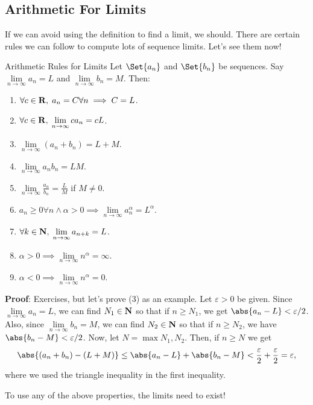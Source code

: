 \subsection{Arithmetic For Limits}
If we can avoid using the definition to find a limit, we should.
There are certain rules we can follow to compute lots of sequence limits.
Let's see them now!

\begin{Theorem}{Arithmetic Rules for Limits}{}
    Let $ \Set{a_n} $ and $ \Set{b_n} $ be sequences.
    Say $ \lim\limits_{{n} \to {\infty}}a_n=L $
    and $ \lim\limits_{{n} \to {\infty}}b_n=M $. Then:
    \begin{enumerate}[(1)]
        \item $ \forall c\in\mathbf{R},\; a_n=C\forall n\implies C=L $.
        \item $ \forall c\in\mathbf{R},\; \lim\limits_{{n} \to {\infty}}c a_n=cL $.
        \item $ \lim\limits_{{n} \to {\infty}}(a_n+b_n)=L+M $.
        \item $ \lim\limits_{{n} \to {\infty}}a_n b_n=LM $.
        \item $ \lim\limits_{{n} \to {\infty}}\frac{a_n}{b_n}=\frac{L}{M} $
              if $ M\ne 0 $.
        \item $ a_n\ge 0\forall n\land \alpha>0\implies \lim\limits_{{n} \to {\infty}}a_n^\alpha=L^\alpha $.
        \item $ \forall k\in\mathbf{N},\; \lim\limits_{{n} \to {\infty}}a_{n+k}=L $.
        \item $ \alpha>0\implies \lim\limits_{{n} \to {\infty}}n^\alpha=\infty $.
        \item $ \alpha<0\implies \lim\limits_{{n} \to {\infty}}n^\alpha=0 $.
    \end{enumerate}
    \tcblower{}
    \textbf{Proof}: Exercises, but let's prove (3) as an example.
    Let $ \varepsilon>0 $ be given. Since $ \lim\limits_{{n} \to {\infty}}a_n=L $,
    we can find $ N_1\in \mathbf{N} $ so that if $ n\ge N_1 $,
    we get $ \abs{a_n-L}<\varepsilon/2 $. Also,
    since $ \lim\limits_{{n} \to {\infty}}b_n=M $, we can find $ N_2\in \mathbf{N} $
    so that if $ n\ge N_2 $, we have $ \abs{b_n-M}<\varepsilon/2 $.
    Now, let $ N=\max{N_1,N_2} $. Then, if $ n\ge N $
    we get
    \[ \abs{(a_n+b_n)-(L+M)}\le \abs{a_n-L}+\abs{b_n-M}<\frac{\varepsilon}{2}+\frac{\varepsilon}{2}=\varepsilon, \]
    where we used the triangle inequality in the first inequality.
\end{Theorem}
\begin{Remark}{}{}
    To use any of the above properties, the limits need to exist!
\end{Remark}
